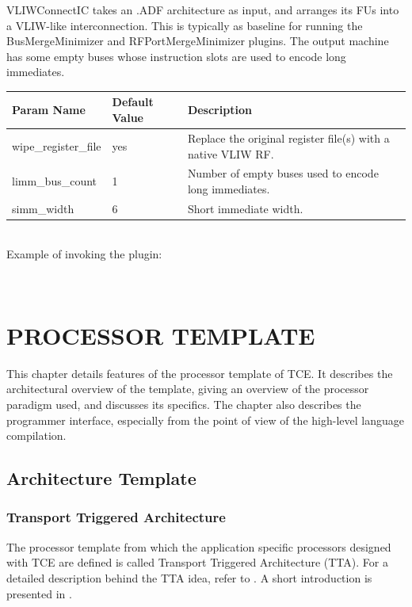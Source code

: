 \documentclass[twoside]{tceusermanual}
\begin{document}
VLIWConnectIC takes an .ADF architecture as input, and arranges its FUs into a
VLIW-like interconnection. This is typically as baseline for running the
BusMergeMinimizer and RFPortMergeMinimizer plugins. The output machine has some
empty buses whose instruction slots are used to encode long immediates.

\begin{tabular}{p{}p{}
                p{}}
\textbf{Param Name} &\textbf{Default Value} &\textbf{Description} \\
\hline
wipe\_register\_file & yes & Replace the original register file(s) with a native VLIW RF. \\
limm\_bus\_count & 1 & Number of empty buses used to encode long immediates. \\
simm\_width & 6 & Short immediate width. \\
\end{tabular}\\

Example of invoking the plugin:

\\

\chapter{PROCESSOR TEMPLATE}
\label{section:template}

This chapter details features of the processor template of TCE.
It describes the architectural overview of the template, giving 
an overview of the processor paradigm used, and discusses
its specifics. The chapter also describes the programmer interface, 
especially from the point of view of the high-level language 
compilation.

\section{Architecture Template}

\subsection{Transport Triggered Architecture} 

The processor template from which the application specific processors
designed with TCE are defined is called Transport Triggered
Architecture (TTA). For a detailed description behind the TTA
idea, refer to \cite{HCorp97}. A short introduction is presented
in \cite{boutellier11}.
\end{document}
